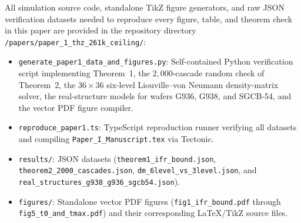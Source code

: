 \documentclass[11pt,letterpaper]{article}
\begin{document}
All simulation source code, standalone TikZ figure generators, and raw JSON verification datasets needed to reproduce every figure, table, and theorem check in this paper are provided in the repository directory \texttt{/papers/paper\_1\_thz\_261k\_ceiling/}:
\begin{itemize}
    \item \texttt{generate\_paper1\_data\_and\_figures.py}: Self-contained Python verification script implementing Theorem~1, the $2{,}000$-cascade random check of Theorem~2, the $36\times 36$ six-level Liouville--von Neumann density-matrix solver, the real-structure models for wafers G936, G938, and SGCB-54, and the vector PDF figure compiler.
    \item \texttt{reproduce\_paper1.ts}: TypeScript reproduction runner verifying all datasets and compiling \texttt{Paper\_I\_Manuscript.tex} via Tectonic.
    \item \texttt{results/}: JSON datasets (\texttt{theorem1\_ifr\_bound.json}, \texttt{theorem2\_2000\_cascades.json}, \texttt{dm\_6level\_vs\_3level.json}, and \texttt{real\_structures\_g938\_g936\_sgcb54.json}).
    \item \texttt{figures/}: Standalone vector PDF figures (\texttt{fig1\_ifr\_bound.pdf} through \texttt{fig5\_t0\_and\_tmax.pdf}) and their corresponding LaTeX/TikZ source files.
\end{itemize}
\end{document}

